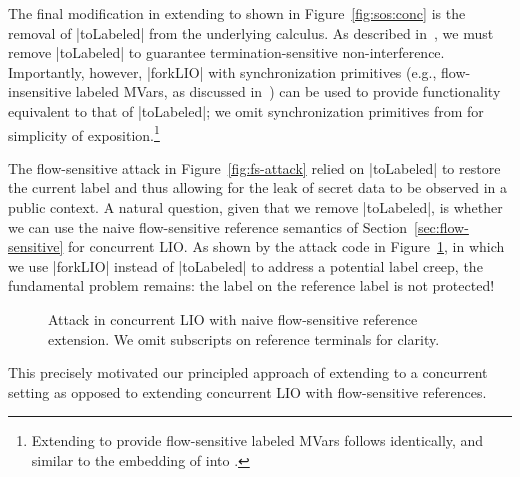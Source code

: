 The final modification in extending \lioafs{} to \lioconc{} shown in
Figure~\ref{fig:sos:conc} is the removal of |toLabeled| from the underlying
calculus.
%
As described in~\cite{stefan:addressing-covert}, we must remove |toLabeled| to
guarantee termination-sensitive non-interference.
%
Importantly, however, |forkLIO| with synchronization primitives (e.g.,
flow-insensitive labeled MVars, as discussed
in~\cite{stefan:addressing-covert}) can be used to provide functionality
equivalent to that of |toLabeled|;
%
we omit synchronization primitives from \lioconc{} for simplicity of
exposition.\footnote{
%
Extending \lioconc{} to provide flow-sensitive labeled MVars follows
identically, and similar to the embedding of \liofs{} into \lio{}. 
}

The flow-sensitive attack in Figure~\ref{fig:fs-attack} relied on |toLabeled|
to restore the current label and thus allowing for the leak of secret data to be
observed in a public context.
%
A natural question, given that we remove |toLabeled|, is whether we can use the
naive flow-sensitive reference semantics of Section~\ref{sec:flow-sensitive}
for concurrent LIO.
%
As shown by the attack code in Figure~\ref{fig:fs-conc-attack}, in which we use
|forkLIO| instead of |toLabeled| to address a potential label creep, the
fundamental problem remains: the label on the reference label is not protected!
%
\begin{figure}
\small
{}
\cut{$}
\caption{Attack in concurrent LIO with naive flow-sensitive reference
extension. We omit subscripts on reference terminals for clarity.
\label{fig:fs-conc-attack}}
\end{figure}
%
This precisely motivated our principled approach of extending \lioafs{} to a
concurrent setting as opposed to extending concurrent LIO with flow-sensitive
references.


